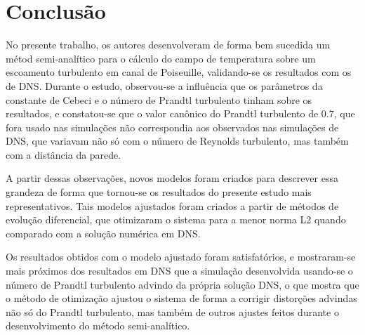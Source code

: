 \chapter[Conclusão]{Conclusão}

No presente trabalho, os autores desenvolveram de forma bem sucedida um métod semi-analítico para o cálculo do campo de temperatura sobre um escoamento turbulento em canal de Poiseuille, validando-se os resultados com os de DNS. Durante o estudo, observou-se a influência que os parâmetros da constante de Cebeci e o número de Prandtl turbulento tinham sobre os resultados, e constatou-se que o valor canônico do Prandtl turbulento de $0.7$, que fora usado nas simulações não correspondia aos observados nas simulações de DNS, que variavam não só com o número de Reynolds turbulento, mas também com a distância da parede.

A partir dessas observações, novos modelos foram criados para descrever essa grandeza de forma que tornou-se os resultados do presente estudo mais representativos. Tais modelos ajustados foram criados a partir de métodos de evolução diferencial, que otimizaram o sistema para a menor norma L2 quando comparado com a solução numérica em DNS.

Os resultados obtidos com o modelo ajustado foram satisfatórios, e mostraram-se mais próximos dos resultados em DNS que a simulação desenvolvida usando-se o número de Prandtl turbulento advindo da própria solução DNS, o que mostra que o método de otimização ajustou o sistema de forma a corrigir distorções advindas não só do Prandtl turbulento, mas também de outros ajustes feitos durante o desenvolvimento do método semi-analítico.
